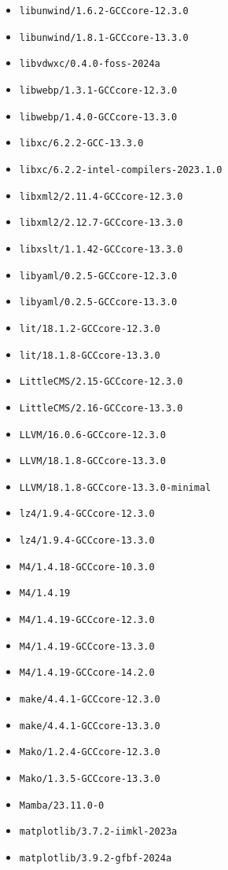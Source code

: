 \begin{multicols}{3}
\begin{itemize}
\item \verb|libunwind/1.6.2-GCCcore-12.3.0|
\item \verb|libunwind/1.8.1-GCCcore-13.3.0|
\item \verb|libvdwxc/0.4.0-foss-2024a|
\item \verb|libwebp/1.3.1-GCCcore-12.3.0|
\item \verb|libwebp/1.4.0-GCCcore-13.3.0|
\item \verb|libxc/6.2.2-GCC-13.3.0|
\item \verb|libxc/6.2.2-intel-compilers-2023.1.0|
\item \verb|libxml2/2.11.4-GCCcore-12.3.0|
\item \verb|libxml2/2.12.7-GCCcore-13.3.0|
\item \verb|libxslt/1.1.42-GCCcore-13.3.0|
\item \verb|libyaml/0.2.5-GCCcore-12.3.0|
\item \verb|libyaml/0.2.5-GCCcore-13.3.0|
\item \verb|lit/18.1.2-GCCcore-12.3.0|
\item \verb|lit/18.1.8-GCCcore-13.3.0|
\item \verb|LittleCMS/2.15-GCCcore-12.3.0|
\item \verb|LittleCMS/2.16-GCCcore-13.3.0|
\item \verb|LLVM/16.0.6-GCCcore-12.3.0|
\item \verb|LLVM/18.1.8-GCCcore-13.3.0|
\item \verb|LLVM/18.1.8-GCCcore-13.3.0-minimal|
\item \verb|lz4/1.9.4-GCCcore-12.3.0|
\item \verb|lz4/1.9.4-GCCcore-13.3.0|
\item \verb|M4/1.4.18-GCCcore-10.3.0|
\item \verb|M4/1.4.19|
\item \verb|M4/1.4.19-GCCcore-12.3.0|
\item \verb|M4/1.4.19-GCCcore-13.3.0|
\item \verb|M4/1.4.19-GCCcore-14.2.0|
\item \verb|make/4.4.1-GCCcore-12.3.0|
\item \verb|make/4.4.1-GCCcore-13.3.0|
\item \verb|Mako/1.2.4-GCCcore-12.3.0|
\item \verb|Mako/1.3.5-GCCcore-13.3.0|
\item \verb|Mamba/23.11.0-0|
\item \verb|matplotlib/3.7.2-iimkl-2023a|
\item \verb|matplotlib/3.9.2-gfbf-2024a|

\end{itemize}
\end{multicols}
